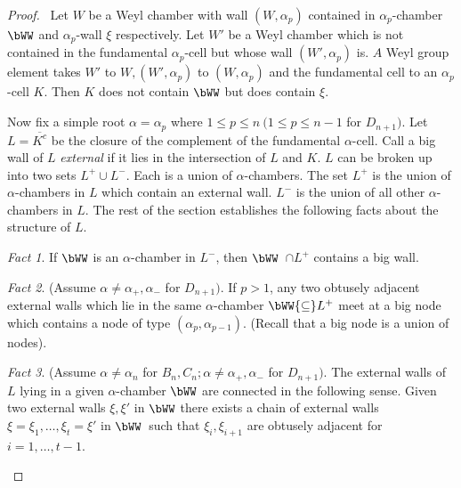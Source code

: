 \documentclass{memo-l}
\theoremstyle{definition}
\theoremstyle{remark}
\newtheorem{fact}{Fact}
\numberwithin{section}{chapter}
\numberwithin{equation}{chapter}
\begin{document}
\begin{proof} \ Let $W$ be a Weyl chamber with wall $(W,{\alpha}_{p})$
contained in ${\alpha}_{p}$-chamber $\bWW$ and ${\alpha}_{p}$-wall
${\xi}$ respectively.  Let $W'$ be a Weyl chamber which is not contained in
the fundamental ${\alpha}_{p}$-cell but whose wall $(W',{\alpha}_{p})$ is.
$A$ Weyl group element takes $W'$ to $W, (W',{\alpha}_{p})$ to
$(W,{\alpha}_{p})$ and the fundamental cell to an ${\alpha}_{p}$-cell $K$.
Then $K$ does not contain $\bWW$ but does contain ${\xi}$.

{\medskip}

   Now fix a simple root ${\alpha} = {\alpha}_{p}$ where $1 \le p \le n
\ (1 \le p \le n-1$ for $D_{n+1})$.  Let $L = \overline{K^{c}}$ be the closure
of the complement of the fundamental ${\alpha}$-cell.  Call a big wall of
$L$ {\it external} if it lies in the intersection of $L$ and $K$.  $L$ can
be broken up into two sets $L^{+} \cup L^{-}$.  Each is a
union of ${\alpha}$-chambers.  The set $L^{+}$ is the union of
${\alpha}$-chambers in $L$ which contain an external wall.  $L^-$ is the
union of all other ${\alpha}$-chambers in $L$.  The rest of the section
establishes the following facts about the structure of $L$.
 
\begin{fact} %
If $\bWW$ is an ${\alpha}$-chamber in
$L^-$, then $\bWW$\ $ \cap  L^{+}$ contains a big wall.
\end{fact}


\begin{fact} %
(Assume ${\alpha}\ne {\alpha}_{+},{\alpha}_{-}$ for
$D_{n+1})$.  If $p > 1$, any two obtusely adjacent external walls which lie
in the same ${\alpha}$-chamber $\bWW{\subseteq} L^{+}$ meet at a big
node which contains a node of type $({\alpha}_{p},{\alpha}_{p-1})$.
(Recall that a big node is a union of nodes).
\end{fact}

\begin{fact} %
(Assume $\alpha\ne\alpha_n$ for $B_{n},C_{n}; {\alpha} \ne
{\alpha}_{+},{\alpha}_{-}$ for $D_{n+1})$.  The external walls of $L$ lying
in a given ${\alpha}$-chamber $\bWW$ are connected in the following
sense.  Given two external walls ${\xi},{\xi}'$ in $\bWW$ there exists a
chain of external walls ${\xi} = {\xi}_{1},\ldots ,{\xi}_{t} = {\xi}'$ in 
$\bWW$\  such that ${\xi}_{i},{\xi}_{i+1}$ are obtusely adjacent 
for $i = 1,\ldots ,t-1$.
\end{fact}



\end{proof}
\end{document}
